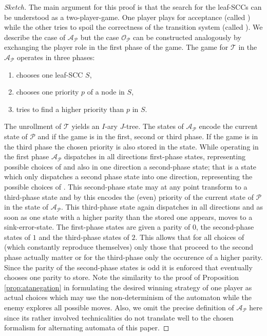 \begin{proof}[Sketch]
  The main argument for this proof is that the search for the leaf-\acp{SCC} 
  can be understood as a two-player-game. One player plays for acceptance 
  (called \acceptor{}) while the other tries to spoil the correctness of the 
  transition system (called \spoiler{}). We describe the case of 
  $\mathcal{A}_{\mathcal{P}}$ but the case $\mathcal{O}_{\mathcal{P}}$ can be 
  constructed analogously by exchanging the player role in the first phase of 
  the game. The game for $\mathcal{T}$ in the $\mathcal{A}_{\mathcal{P}}$ 
  operates in three phases:
  \begin{enumerate}
    \item \spoiler{} chooses one leaf-\ac{SCC} $S$,
    \item \acceptor{} chooses one priority $p$ of a node in $S$,
    \item \spoiler{} tries to find a higher priority than $p$ in $S$.
  \end{enumerate}
  The unrollment of $\mathcal{T}$ yields an $I$-ary $J$-tree. The states of 
  $\mathcal{A}_{\mathcal{P}}$ encode the current state of $\mathcal{P}$ and if
  the game is in the first, second or third phase. If the game is in the third
  phase the chosen priority is also stored in the state. While operating in the
  first phase $\mathcal{A}_{\mathcal{P}}$ dispatches in all directions 
  first-phase states, representing possible choices of \spoiler{} and also in
  one direction a second-phase state; that is a state which only dispatches a
  second phase state into one direction, representing the possible choices of
  \acceptor{}. This second-phase state may at any point transform to a 
  third-phase state and by this encodes the (even) priority of the current 
  state of $\mathcal{P}$ in the state of $\mathcal{A}_{\mathcal{P}}$. This 
  third-phase state again dispatches in all directions and as soon as one state 
  with a higher parity than the stored one appears, moves to a 
  sink-error-state. The first-phase states are given a parity of $0$, the 
  second-phase states of $1$ and the third-phase states of $2$. This allows 
  that for all choices of \spoiler{} (which constantly reproduce themselves) 
  only those that proceed to the second phase actually matter or for the 
  third-phase only the occurence of a higher parity. Since the parity of the 
  second-phase states is odd it is enforced that \acceptor{} eventually chooses 
  one parity to store. Note the similarity to the proof of Proposition
  \ref{prop:atanegation} in formulating the desired winning strategy of one 
  player as actual choices which may use the non-determinism of the automaton 
  while the enemy explores all possible moves. Also, we omit the precise 
  definition of $\mathcal{A}_{\mathcal{P}}$ here since its rather involved 
  technicalities do not translate well to the chosen formalism for alternating 
  automata of this paper.
\end{proof}

